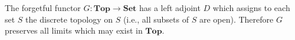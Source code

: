 The forgetful functor $G: \mathbf{Top} \to \mathbf{Set}$ has a left adjoint $D$ which assigns to each set $S$ the discrete topology on $S$ (i.e., all subsets of $S$ are open). Therefore $G$ preserves all limits which may exist in $\mathbf{Top}$.
